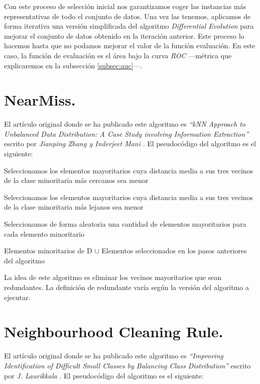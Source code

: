 Con este proceso de selección inicial nos garantizamos coger las instancias más representativas de todo el conjunto de datos. Una vez las tenemos, aplicamos de forma iterativa una versión simplificada del algoritmo \textit{Differential Evolution} \cite{differential_evolution} para mejorar el conjunto de datos obtenido en la iteración anterior. Este proceso lo hacemos hasta que no podamos mejorar el valor de la función evaluación. En este caso, la función de evaluación es el área bajo la curva \textit{ROC} —métrica que explicaremos en la subsección \ref{subsec:auc}—.

\section{NearMiss.} \label{sec:alg_nm}
El artículo original donde se ha publicado este algoritmo es \textit{``kNN Approach to Unbalanced Data Distribution: A Case Study involving Information Extraction''} escrito por \textit{Jianping Zhang y Inderjeet Mani} \cite{nm}. El pseudocódigo del algoritmo es el siguiente:

\begin{codigo}
\begin{algorithmic}[1]
\State \parbox[t]{295pt}{Seleccionamos los elementos mayoritarios cuya distancia media a sus tres vecinos de la clase minoritaria más cercanos sea menor\strut}
\State \parbox[t]{290pt}{Seleccionamos los elementos mayoritarios cuya distancia media a sus tres vecinos de la clase minoritaria más lejanos sea menor\strut}
\Else
\State \parbox[t]{290pt}{Seleccionamos de forma aleatoria una cantidad de elementos mayoritarios para cada elemento minoritario\strut}
\EndIf
\EndIf
{}
\end{algorithmic}
\end{codigo}
	
\begin{codigo}
\begin{algorithmic}[1]
\State \parbox[t]{305pt}{\Return Elementos minoritarios de D $\cup$ Elementos seleccionados en los pasos anteriores del algoritmo\strut}
\EndFunction 
\end{algorithmic}
\end{codigo}

La idea de este algoritmo es eliminar los vecinos mayoritarios que sean redundantes. La definición de redundante varía según la versión del algoritmo a ejecutar.

\section{Neighbourhood Cleaning Rule.} \label{sec:alg_ncl}
El artículo original donde se ha publicado este algoritmo es \textit{``Improving Identification of Difficult Small Classes by Balancing Class Distribution''} escrito por \textit{J. Laurikkala} \cite{ncl}. El pseudocódigo del algoritmo es el siguiente:

